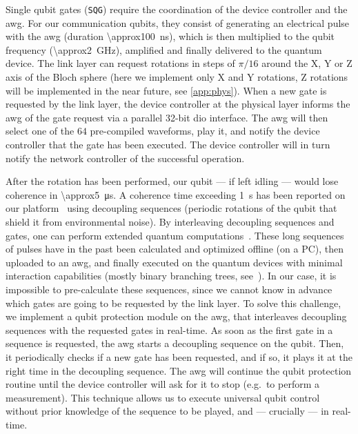 Single qubit gates (\texttt{SQG}) require the coordination of the device controller and the
\acrshort{awg}. For our communication qubits, they consist of generating an electrical pulse with
the \acrshort{awg} (duration \qty{\approx100}{\ns}), which is then multiplied to the qubit frequency
(\qty{\approx2}{\GHz}), amplified and finally delivered to the quantum device. The link layer can
request rotations in steps of $\pi/16$ around the X, Y or Z axis of the Bloch sphere (here we
implement only X and Y rotations, Z rotations will be implemented in the near future, see
\cref{app:phys}). When a new gate is requested by the link layer, the device controller at the
physical layer informs the \acrshort{awg} of the gate request via a parallel \num{32}-bit
\acrshort{dio} interface. The \acrshort{awg} will then select one of the $64$ pre-compiled
waveforms, play it, and notify the device controller that the gate has been executed. The device
controller will in turn notify the network controller of the successful operation.

After the rotation has been performed, our qubit --- if left idling --- would lose coherence in
\qty{\approx5}{\us}. A coherence time exceeding \qty{1}{s} has been reported on our
platform~\cite{abobeih_2018_one_sec} using decoupling sequences (periodic rotations of the qubit
that shield it from environmental noise). By interleaving decoupling sequences and gates, one can
perform extended quantum computations~\cite{bradley_2019_one_min}. These long sequences of pulses
have in the past been calculated and optimized offline (on a PC), then uploaded to an
\acrshort{awg}, and finally executed on the quantum devices with minimal interaction capabilities
(mostly binary branching trees, see~\cite{pompili_2021_multinode}). In our case, it is impossible to
pre-calculate these sequences, since we cannot know in advance which gates are going to be requested
by the link layer. To solve this challenge, we implement a {qubit protection} module on the
\acrshort{awg}, that interleaves decoupling sequences with the requested gates in real-time. As soon
as the first gate in a sequence is requested, the \acrshort{awg} starts a decoupling sequence on the
qubit. Then, it periodically checks if a new gate has been requested, and if so, it plays it at the
right time in the decoupling sequence. The \acrshort{awg} will continue the qubit protection routine
until the device controller will ask for it to stop (e.g.~to perform a measurement). This technique
allows us to execute universal qubit control without prior knowledge of the sequence to be played,
and --- crucially --- in real-time.

